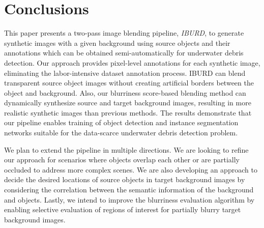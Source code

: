 \section{Conclusions}
This paper presents a two-pass image blending pipeline, \textit{IBURD}, to generate synthetic images with a given background using source objects and their annotations which can be obtained semi-automatically for underwater debris detection. 
Our approach provides pixel-level annotations for each synthetic image, eliminating the labor-intensive dataset annotation process. 
IBURD can blend transparent source object images without creating artificial borders between the object and background. 
Also, our blurriness score-based blending method can dynamically synthesize source and target background images, resulting in more realistic synthetic images than previous methods.
The results demonstrate that our pipeline enables training of object detection and instance segmentation networks suitable for the data-scarce underwater debris detection problem. 

We plan to extend the pipeline in multiple directions. 
We are looking to refine our approach for scenarios where objects overlap each other or are partially occluded to address more complex scenes.
We are also developing an approach to decide the desired locations of source objects in target background images by considering the correlation between the semantic information of the background and objects. 
Lastly, we intend to improve the blurriness evaluation algorithm by enabling selective evaluation of regions of interest for partially blurry target background images. 
